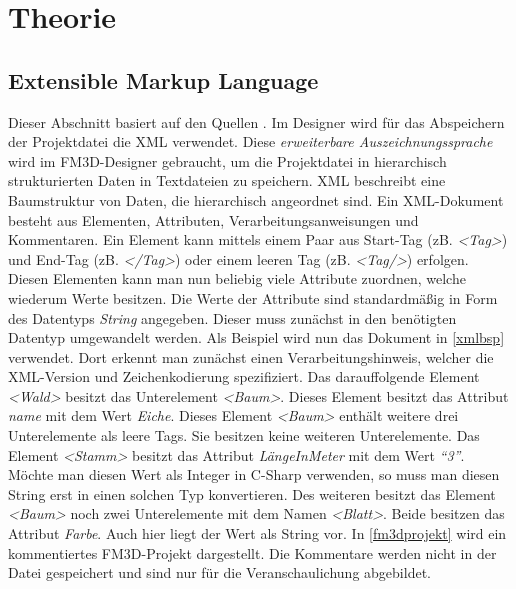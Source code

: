\chapter{Theorie}
\label{theorie}




\section[Extensible Markup Language]{Extensible Markup Language}
\label{extensiblemarkuplanguage}

Dieser Abschnitt basiert auf den Quellen  \cite{xml}\cite{xmlcstutorials}\cite{msdn}. Im Designer wird für das Abspeichern der Projektdatei die \ac{XML} verwendet.  Diese \textit{erweiterbare Auszeichnungssprache} wird im FM3D-Designer gebraucht, um die Projektdatei in hierarchisch strukturierten Daten in Textdateien zu speichern.
\ac{XML} beschreibt eine Baumstruktur von Daten, die hierarchisch angeordnet sind. Ein \ac{XML}-Dokument besteht aus Elementen, Attributen, Verarbeitungsanweisungen und Kommentaren. 
Ein Element kann mittels einem Paar aus Start-Tag (zB. \textit{<Tag>}) und End-Tag (zB. \textit{</Tag>}) oder einem leeren Tag (zB. \textit{<Tag/>}) erfolgen.
Diesen Elementen kann man nun beliebig viele Attribute zuordnen, welche wiederum Werte besitzen.
Die Werte der Attribute sind standardmäßig in Form des Datentyps \textit{String} angegeben. Dieser muss zunächst in den benötigten Datentyp umgewandelt werden.
Als Beispiel wird nun das Dokument in \cref{xmlbsp} verwendet. 
Dort erkennt man zunächst einen Verarbeitungshinweis, welcher die XML-Version und Zeichenkodierung spezifiziert. Das darauffolgende Element \textit{<Wald>} besitzt das Unterelement \textit{<Baum>}. Dieses Element besitzt das Attribut \textit{name} mit dem Wert \textit{Eiche}. 
Dieses Element \textit{<Baum>} enthält weitere drei Unterelemente als leere Tags. Sie besitzen keine weiteren Unterelemente. Das Element \textit{<Stamm>} besitzt das Attribut \textit{LängeInMeter} mit dem Wert \textit{"`3"'}. Möchte man diesen Wert als Integer in C-Sharp verwenden, so muss man diesen String erst in einen solchen Typ konvertieren. Des weiteren besitzt das Element \textit{<Baum>} noch zwei Unterelemente mit dem Namen \textit{<Blatt>}. Beide besitzen das Attribut \textit{Farbe}. Auch hier liegt der Wert als String vor.
In \cref{fm3dprojekt} wird ein kommentiertes FM3D-Projekt dargestellt. Die Kommentare werden nicht in der Datei gespeichert und sind nur für die Veranschaulichung abgebildet.
